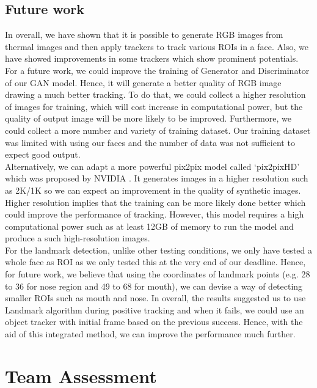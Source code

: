 \documentclass[conference]{IEEEtran}
\begin{document}
\subsection{Future work}
In overall, we have shown that it is possible to generate RGB images from thermal images and then apply trackers to track various ROIs in a face. Also, we have showed improvements in some trackers which show prominent potentials. For a future work, we could improve the training of Generator and Discriminator of our GAN model. Hence, it will generate a better quality of RGB image drawing a much better tracking. To do that, we could collect a higher resolution of images for training, which will cost increase in computational power, but the quality of output image will be more likely to be improved. Furthermore, we could collect a more number and variety of training dataset. Our training dataset was limited with using our faces and the number of data was not sufficient to expect good output.\\
Alternatively, we can adapt a more powerful pix2pix model called ‘pix2pixHD’ which was proposed by NVIDIA \cite{b15}. It generates images in a higher resolution such as 2K/1K so we can expect an improvement in the quality of synthetic images. Higher resolution implies that the training can be more likely done better which could improve the performance of tracking. However, this model requires a high computational power such as at least 12GB of memory\cite{b15} to run the model and produce a such high-resolution images. \\
For the landmark detection, unlike other testing conditions, we only have tested a whole face as ROI as we only tested this at the very end of our deadline. Hence, for future work, we believe that using the coordinates of landmark points (e.g. 28 to 36 for nose region and 49 to 68 for mouth\cite{b22}), we can devise a way of detecting smaller ROIs such as mouth and nose. In overall, the results suggested us to use Landmark\cite{b21} algorithm during positive tracking and when it fails, we could use an object tracker with initial frame based on the previous success. Hence, with the aid of this integrated method, we can improve the performance much further.
 
\section{Team Assessment}
\end{document}
